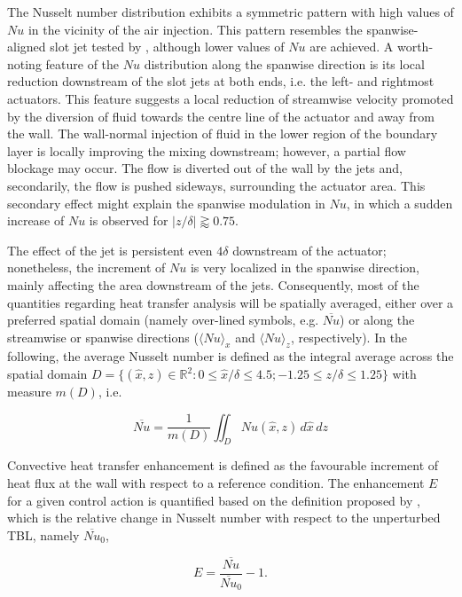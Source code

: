 The Nusselt number distribution exhibits a symmetric pattern with high values of $Nu$ in the vicinity of the air injection. This pattern resembles the spanwise-aligned slot jet tested by \citet{Castellanos2022slotjet}, although lower values of $Nu$ are achieved. A worth-noting feature of the $Nu$ distribution along the spanwise direction is its local reduction downstream of the slot jets at both ends, i.e. the left- and rightmost actuators. This feature suggests a local reduction of streamwise velocity promoted by the diversion of fluid towards the centre line of the actuator and away from the wall. The wall-normal injection of fluid in the lower region of the boundary layer is locally improving the mixing downstream; however, a partial flow blockage may occur. The flow is diverted out of the wall by the jets and, secondarily, the flow is pushed sideways, surrounding the actuator area. This secondary effect might explain the spanwise modulation in $Nu$, in which a sudden increase of $Nu$ is observed for $|z/\delta| \gtrapprox 0.75$.

The effect of the jet is persistent even $4\delta$ downstream of the actuator; nonetheless, the increment of $Nu$ is very localized in the spanwise direction, mainly affecting the area downstream of the jets. Consequently, most of the quantities regarding heat transfer analysis will be spatially averaged, either over a preferred spatial domain (namely over-lined symbols, e.g. $\overline{Nu}$) or along the streamwise or spanwise directions ($\langle Nu \rangle_x$ and $\langle Nu \rangle_z$, respectively). In the following, the average Nusselt number is defined as the integral average across the spatial domain $D = \{(\hat{x},z) \in \mathbb{R}^2:  0\leq \hat{x}/\delta \leq 4.5; -1.25 \leq z/\delta \leq 1.25\}$ with measure $m(D)$, i.e.

\begin{equation} \label{eq:Num}
    \overline{Nu} = \frac{1}{m(D)}\iint_{D}^{} Nu(\hat{x},z) \,d\hat{x}\,dz
\end{equation}

Convective heat transfer enhancement is defined as the favourable increment of heat flux at the wall with respect to a reference condition. The enhancement $E$ for a given control action is quantified based on the definition proposed by \citet{Castellanos2022slotjet}, which is the relative change in Nusselt number with respect to the unperturbed TBL, namely $\overline{Nu}_\mathrm{0}$,

\begin{equation} \label{eq:E}
    E = \frac{\overline{Nu}}{\overline{Nu}_\mathrm{0}}-1.
\end{equation}

